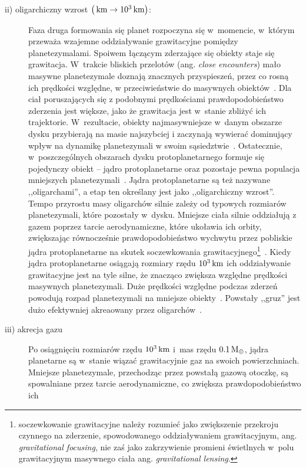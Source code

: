 \begin{description}
\item[ii) oligarchiczny wzrost $\left(\hbox{$\thinspace\textrm{km}$} \rightarrow
   10^3\hbox{$\thinspace\textrm{km}$}\right)$:]
   Faza druga formowania się planet rozpoczyna się w~momencie, w~którym przeważa
   wzajemne oddziaływanie grawitacyjne pomiędzy planetezymalami. Spoiwem
   łączącym zderzające się obiekty staje się grawitacja. W~trakcie bliskich
   przelotów (ang. \emph{close encounters}) mało masywne planetezymale doznają
   znacznych przyspieszeń, przez co rosną ich prędkości względne, w
   przeciwieństwie do masywnych obiektów~\cite{WS93}. Dla ciał poruszających się z
   podobnymi prędkościami prawdopodobieństwo zderzenia jest większe, jako że
   grawitacja jest w~stanie zbliżyć ich trajektorie. W~rezultacie, obiekty
   najmasywniejsze w~danym obszarze dysku przybierają na masie najszybciej i
   zaczynają wywierać dominujący wpływ na dynamikę planetezymali w swoim
   sąsiedztwie~\cite{IM93}. 
   Ostatecznie, w~poszczególnych obszarach dysku
   protoplanetarnego formuje się pojedynczy obiekt -- jądro protoplanetarne
   oraz pozostaje pewna populacja mniejszych planetezymali~\cite{KI98}. Jądra
   protoplanetarne są też nazywane ,,oligarchami'', a etap ten określany jest
   jako ,,oligarchiczny wzrost''.
   Tempo przyrostu masy oligarchów silnie zależy od typowych rozmiarów
   planetezymali, które pozostały w~dysku. Mniejsze ciała silnie oddziałują z
   gazem poprzez tarcie aerodynamiczne, które ukoławia ich orbity, zwiększając
   równocześnie prawdopodobieństwo wychwytu przez pobliskie jądra
   protoplanetarne na skutek soczewkowania
   grawitacyjnego\footnote{soczewkowanie grawitacyjne należy rozumieć jako
      zwiększenie przekroju czynnego na zderzenie, spowodowanego oddziaływaniem
   grawitacyjnym, ang. \emph{gravitational focusing}, nie zaś jako zakrzywienie
promieni świetlnych w~polu grawitacyjnym masywnego ciała ang.
\emph{gravitational lensing}.}~\cite{R04}.
   Kiedy jądra protoplanetarne osiągają rozmiary rzędu $10^3\hbox{$\thinspace\textrm{km}$}$ ich oddziaływanie
   grawitacyjne jest na tyle silne, że znacząco zwiększa względne prędkości
   masywnych planetezymali. Duże prędkości względne podczas zderzeń powodują rozpad
   planetezymali na mniejsze obiekty~\cite{KB04}. Powstały ,,gruz'' jest dużo
   efektywniej akreaowany przez oligarchów~\cite{WS93}.
\item[iii) akrecja gazu]
   Po osiągnięciu rozmiarów rzędu $10^3\hbox{$\thinspace\textrm{km}$}$ i~mas rzędu $0.1\hbox{$\mathrm{\thinspace M_{\oplus}}$}$, jądra
   planetarne są w~stanie wiązać grawitacyjnie gaz na swoich powierzchniach.
   Mniejsze planetezymale, przechodząc przez powstałą gazową otoczkę, są
   spowalniane przez tarcie aerodynamiczne, co zwiększa prawdopodobieństwo ich

\end{description}
